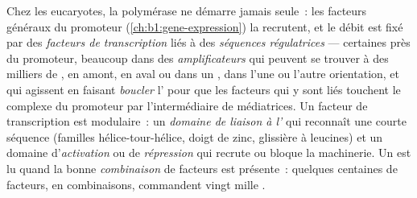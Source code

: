 \begin{definition}\label{def:b1:expression-control:enhancer}
Chez les eucaryotes, la polymérase ne démarre jamais seule~: les
facteurs généraux du promoteur (\cref{ch:b1:gene-expression}) la
recrutent, et le débit est fixé par des \emph{facteurs de transcription}
liés à des \emph{séquences régulatrices} --- certaines près du
promoteur, beaucoup dans des \emph{amplificateurs} qui peuvent se
trouver à des milliers de , en amont, en aval ou dans un
, dans l'une ou l'autre orientation, et qui agissent en faisant
\emph{boucler} l' pour que les facteurs qui y sont liés touchent le
complexe du promoteur par l'intermédiaire de  médiatrices. Un
facteur de transcription est modulaire~: un \emph{domaine de liaison à
l'} qui reconnaît une courte séquence (familles hélice-tour-hélice,
doigt de zinc, glissière à leucines) et un domaine d'\emph{activation}
ou de \emph{répression} qui recrute ou bloque la machinerie. Un  est
lu quand la bonne \emph{combinaison} de facteurs est présente~: quelques
centaines de facteurs, en combinaisons, commandent vingt mille .
\end{definition}

